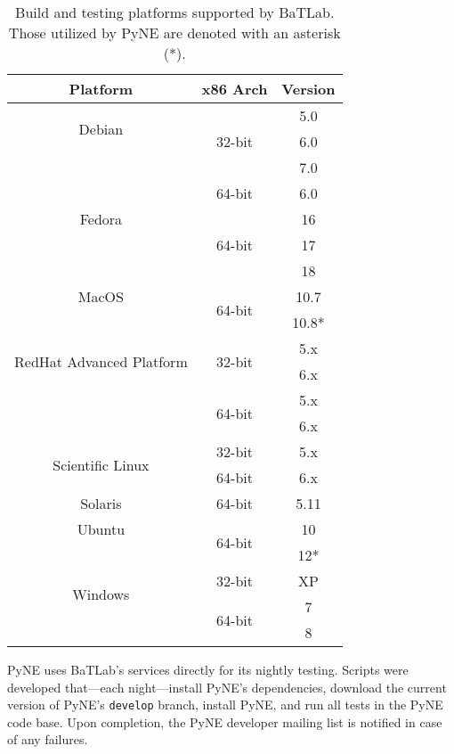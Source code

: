 \documentclass{anstrans}
\begin{document}
\begin{table}[ht]
  \begin{center}
    \caption{\label{tab::batlab}Build and testing platforms supported by BaTLab. 
      Those utilized by PyNE are denoted with an asterisk (*).}
    \begin{tabular}{|c|c|c|}
    \hline
    Platform & x86 Arch & Version \\
    \hline
    \multirow{2}{*}{Debian} 
    & \multirow{3}{*}{32-bit} & 5.0 \\ & & 6.0 \\ & & 7.0 \\ 
    \cline{2-3}
    & \multirow{1}{*}{64-bit} & 6.0 \\
    \hline
    \multirow{1}{*}{Fedora} 
    & \multirow{3}{*}{64-bit} & 16 \\ & & 17 \\ & & 18 \\
    \hline
    \multirow{1}{*}{MacOS} 
    & \multirow{2}{*}{64-bit} & 10.7 \\ & & 10.8* \\
    \hline
    \multirow{2}{*}{RedHat Advanced Platform} 
    & \multirow{2}{*}{32-bit} & 5.x \\ & & 6.x \\ 
    \cline{2-3}
    & \multirow{2}{*}{64-bit} & 5.x \\ & & 6.x \\
    \hline
    \multirow{2}{*}{Scientific Linux} 
    & \multirow{1}{*}{32-bit} & 5.x \\ 
    \cline{2-3}
    & \multirow{1}{*}{64-bit} & 6.x \\
    \hline
    \multirow{1}{*}{Solaris} 
    & \multirow{1}{*}{64-bit} & 5.11 \\
    \hline
    \multirow{1}{*}{Ubuntu} 
    & \multirow{2}{*}{64-bit} & 10 \\ & & 12* \\
    \hline
    \multirow{2}{*}{Windows} 
    & \multirow{1}{*}{32-bit} & XP \\ 
    \cline{2-3}
    & \multirow{2}{*}{64-bit} & 7 \\ & & 8 \\
    \hline
    \end{tabular}
  \end{center}
\end{table}

PyNE uses BaTLab's services directly for its nightly testing. Scripts were
developed that---each night---install PyNE's dependencies, download the current version
of PyNE's \texttt{develop} branch, install PyNE, and run all tests in the PyNE
code base. Upon completion, the PyNE developer mailing list is notified in case of
any failures.
\end{document}
